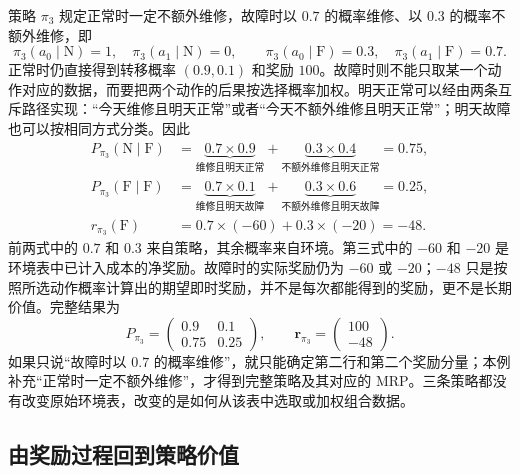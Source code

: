 \documentclass[UTF8]{ctexart}
\begin{document}
\begin{example}
\label{ex:markov-three-policy-random}
策略 $\pi_3$ 规定正常时一定不额外维修，故障时以 $0.7$ 的概率维修、以 $0.3$ 的概率不额外维修，即
\[
  \pi_3(a_0\mid\mathrm N)=1,\quad
  \pi_3(a_1\mid\mathrm N)=0,\qquad
  \pi_3(a_0\mid\mathrm F)=0.3,\quad
  \pi_3(a_1\mid\mathrm F)=0.7.
\]
正常时仍直接得到转移概率 $(0.9,0.1)$ 和奖励 $100$。故障时则不能只取某一个动作对应的数据，而要把两个动作的后果按选择概率加权。明天正常可以经由两条互斥路径实现：“今天维修且明天正常”或者“今天不额外维修且明天正常”；明天故障也可以按相同方式分类。因此
\begin{equation}
  \begin{aligned}
    P_{\pi_3}(\mathrm N\mid\mathrm F)
      &=\underbrace{0.7\times0.9}_{\text{维修且明天正常}}
        +\underbrace{0.3\times0.4}_{\text{不额外维修且明天正常}}
        =0.75,\\
    P_{\pi_3}(\mathrm F\mid\mathrm F)
      &=\underbrace{0.7\times0.1}_{\text{维修且明天故障}}
        +\underbrace{0.3\times0.6}_{\text{不额外维修且明天故障}}
        =0.25,\\
    r_{\pi_3}(\mathrm F)
      &=0.7\times(-60)+0.3\times(-20)=-48.
  \end{aligned}
  \label{eq:markov-three-policy-random-mixture}
\end{equation}
前两式中的 $0.7$ 和 $0.3$ 来自策略，其余概率来自环境。第三式中的 $-60$ 和 $-20$ 是环境表中已计入成本的净奖励。故障时的实际奖励仍为 $-60$ 或 $-20$；$-48$ 只是按照所选动作概率计算出的期望即时奖励，并不是每次都能得到的奖励，更不是长期价值。完整结果为
\begin{equation}
  P_{\pi_3}=\begin{pmatrix}0.9&0.1\\0.75&0.25\end{pmatrix},
  \qquad
  \boldsymbol r_{\pi_3}=\begin{pmatrix}100\\-48\end{pmatrix}.
  \label{eq:markov-three-policy-random-mrp}
\end{equation}
如果只说“故障时以 $0.7$ 的概率维修”，就只能确定第二行和第二个奖励分量；本例补充“正常时一定不额外维修”，才得到完整策略及其对应的 MRP。三条策略都没有改变原始环境表，改变的是如何从该表中选取或加权组合数据。
\end{example}

\subsection{由奖励过程回到策略价值}
\end{document}
